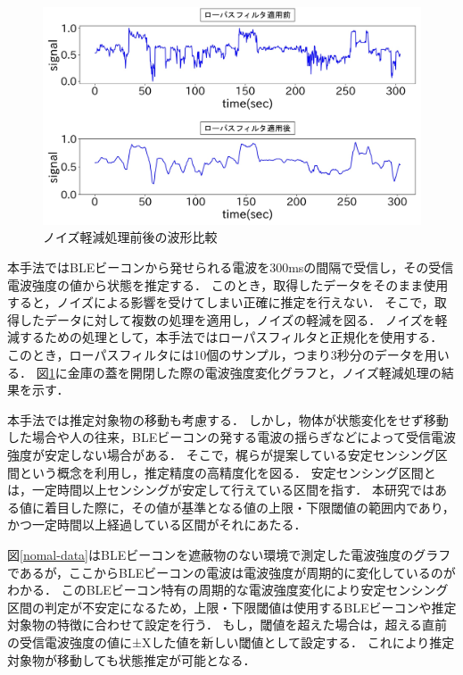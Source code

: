 \begin{figure}[tbh]
    \centering
    \includegraphics[width=14cm]{images/chapter3/lowpath_compare.jpg}
    \caption{ノイズ軽減処理前後の波形比較}
    \label{bank-opcl}
\end{figure}

本手法ではBLEビーコンから発せられる電波を300msの間隔で受信し，その受信電波強度の値から状態を推定する．
このとき，取得したデータをそのまま使用すると，ノイズによる影響を受けてしまい正確に推定を行えない．
そこで，取得したデータに対して複数の処理を適用し，ノイズの軽減を図る．
ノイズを軽減するための処理として，本手法ではローパスフィルタと正規化を使用する．
このとき，ローパスフィルタには10個のサンプル，つまり3秒分のデータを用いる．
図\ref{bank-opcl}に金庫の蓋を開閉した際の電波強度変化グラフと，ノイズ軽減処理の結果を示す．

本手法では推定対象物の移動も考慮する．
しかし，物体が状態変化をせず移動した場合や人の往来，BLEビーコンの発する電波の揺らぎなどによって受信電波強度が安定しない場合がある．
そこで，梶ら\cite{sensing-area}が提案している安定センシング区間という概念を利用し，推定精度の高精度化を図る．
安定センシング区間とは，一定時間以上センシングが安定して行えている区間を指す．
本研究ではある値に着目した際に，その値が基準となる値の上限・下限閾値の範囲内であり，かつ一定時間以上経過している区間がそれにあたる．

図\ref{nomal-data}はBLEビーコンを遮蔽物のない環境で測定した電波強度のグラフであるが，ここからBLEビーコンの電波は電波強度が周期的に変化しているのがわかる．
このBLEビーコン特有の周期的な電波強度変化により安定センシング区間の判定が不安定になるため，上限・下限閾値は使用するBLEビーコンや推定対象物の特徴に合わせて設定を行う．
もし，閾値を超えた場合は，超える直前の受信電波強度の値に±Xした値を新しい閾値として設定する．
これにより推定対象物が移動しても状態推定が可能となる．

